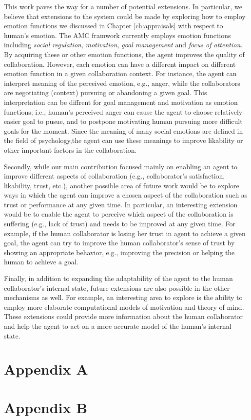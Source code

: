 \documentclass[12pt]{report}
\begin{document}
{\color{red}This work paves the way for a number of potential extensions. In
particular, we believe that extensions to the system could be made by exploring
how to employ emotion functions we discussed in Chapter \ref{ch:appraisals} with
respect to human's emotion. The AMC framwork currently employs emotion functions
including \textit{social regulation}, \textit{motivation}, \textit{goal
management} and \textit{focus of attention}. By acquiring these or other emotion
functions, the agent improves the quality of collaboration. However, each
emotion can have a different impact on different emotion function in a given
collaboration context. For instance, the agent can interpret meaning of the
perceived emotion, e.g., anger, while the collaborators are negotiating
(context) pursuing or abandoning a given goal. This interpretation can be
diffrent for goal management and motivation as emotion functions; i.e., human's
perceived anger can cause the agent to choose relatively easier goal to pusue,
and to postpone motivating human pursuing more difficult goals for the moment.
Since the meaning of many social emotions are defined in the field of
psychology,the agent can use these meanings to improve likability or other
important factors in the collaboration.

Secondly, while our main contribution focused mainly on enabling an agent to
improve different aspects of collaboration (e.g., collaborator's satisfaction,
likability, trust, etc.), another possible area of future work would be to
explore ways in which the agent can improve a chosen aspect of the collaboration
such as trust or performance at any given time. In particular, an interesting
extension would be to enable the agent to perceive which aspect of the
collaboration is suffering (e.g., lack of trust) and needs to be improved at any
given time. For example, if the human collaborator is losing her trust in agent
to achieve a given goal, the agent can try to improve the human collaborator's
sense of trust by showing an appropriate behavior, e.g., improving the
precision or helping the human to achieve a goal.

Finally, in addition to expanding the adaptability of the agent to the human
collaborator's internal state, future extensions are also possible in the other
mechanisms as well. For example, an interesting area to explore is the ability
to employ more elaborate computational models of motivation and theory of mind.
These extensions could provide more information about the human collaborator and
help the agent to act on a more accurate model of the human's internal state.}

\pagebreak





\begin{appendices}
\chapter*{Appendix A}
\label{apdx:crowd-sourced-questionnaires}


\chapter*{Appendix B}
\label{apdx:end-to-end-user-study}

\end{appendices}
\end{document}
